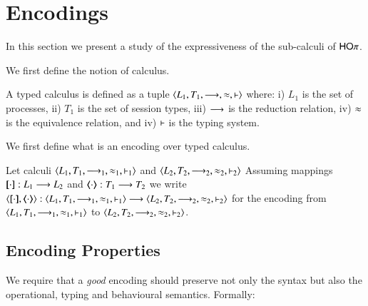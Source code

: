 \newcommand{\enc}[2]{\lrangle{\map{#1}, \mapt{#2}}}
\newcommand{\encod}[3]{\lrangle{\map{#1}^{#3}, \mapt{#2}^{#3}}}

\newcommand{\calc}[5]{\lrangle{#1, #2, #3, #4, #5}}

\section{Encodings}

In this section we present a study of the expressiveness 
of the sub-calculi of $\mathsf{HO}\pi$.

We first define the notion of calculus.

\begin{definition}
	A typed calculus is defined as a tuple $\calc{L_1}{T_1}{\red}{\wb}{\proves}$
	where: i) $L_1$ is the set of processes, ii) $T_1$ is the set of session types,
	iii) $\longrightarrow$ is the reduction relation, iv) $\approx$ is the equivalence
	relation, and iv) $\vdash$ is the typing system.
\end{definition}

We first define what is an encoding over typed calculus.

\begin{definition}
	Let calculi $\calc{L_1}{T_1}{\red_1}{\wb_1}{\proves_1}$
	and $\calc{L_2}{T_2}{\red_2}{\wb_2}{\proves_2}$
	Assuming mappings $[\!\![\cdot]\!\!]: L_1 \longrightarrow L_2$ and
	$\langle\!\!\langle\cdot\rangle\!\!\rangle: T_1 \longrightarrow T_2$
	we write $\enc{\cdot}{\cdot}: \calc{L_1}{T_1}{\red_1}{\wb_1}{\proves_1} \longrightarrow \calc{L_2}{T_2}{\red_2}{\wb_2}{\proves_2}$
	for the encoding from
	$\calc{L_1}{T_1}{\red_1}{\wb_1}{\proves_1}$ to $\calc{L_2}{T_2}{\red_2}{\wb_2}{\proves_2}$.
\end{definition}

\subsection{Encoding Properties}

We require that a {\em good} encoding should 
preserve not only the syntax but
also the operational, typing and behavioural
semantics. Formally:

